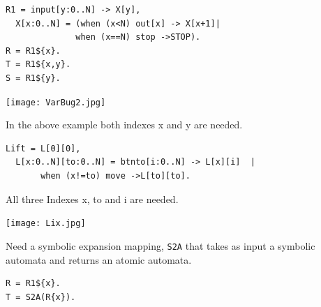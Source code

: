 \documentclass[]{article}
\begin{document}
\vspace{1em} \begin{minipage}{0.55\textwidth}
\begin{verbatim}
R1 = input[y:0..N] -> X[y],
  X[x:0..N] = (when (x<N) out[x] -> X[x+1]|
              when (x==N) stop ->STOP).
R = R1${x}.
T = R1${x,y}.
S = R1${y}.
   \end{verbatim}

\end{minipage}
\begin{minipage}{0.4\textwidth}
\begin{center}\texttt{[image: VarBug2.jpg]}\end{center}
\end{minipage}

In the above example both indexes {\sf x} and {\sf y} are needed.

\vspace{1em} \begin{minipage}{0.55\textwidth}
\begin{verbatim}
Lift = L[0][0],
  L[x:0..N][to:0..N] = btnto[i:0..N] -> L[x][i]  |
       when (x!=to) move ->L[to][to].
  \end{verbatim}

All three Indexes {\sf x}, {\sf to} and {\sf i}  are needed.
\end{minipage}
\begin{minipage}{0.4\textwidth}
\begin{center}\texttt{[image: Lix.jpg]}\end{center}
\end{minipage}



Need a symbolic expansion mapping,  \verb|S2A|  that takes as input a symbolic  automata and returns an atomic automata.




\begin{center}
\begin{minipage}{0.3\textwidth}
\begin{verbatim}
R = R1${x}.
T = S2A(R{x}).
\end{verbatim}
\end{minipage}
\end{center}
\end{document}
